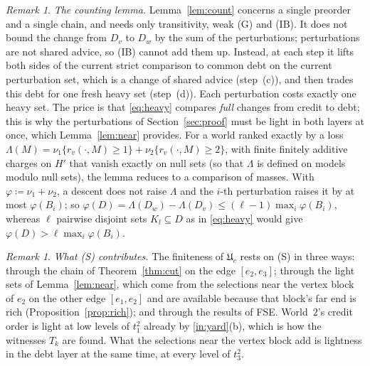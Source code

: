 \documentclass[11pt]{article}
\theoremstyle{definition}\newtheorem{definition}[theorem]{Definition}
\theoremstyle{remark}\newtheorem{remark}[theorem]{Remark}
\newcommand{\UU}{\mathfrak U}
\begin{document}
\begin{remark}\label{rem:count}
\emph{The counting lemma.} Lemma~\ref{lem:count} concerns a single preorder
and a single chain, and needs only transitivity, weak (G) and (IB). It does
not bound the change from $D_v$ to $D_w$ by the sum of the perturbations;
perturbations are not shared advice, so (IB) cannot add them up. Instead, at
each step it lifts both sides of the current strict comparison to common
debt on the current perturbation set, which is a change of shared advice
(step~(c)), and then trades this debt for one fresh heavy set (step~(d)).
Each perturbation costs exactly one heavy set. The price is that
\eqref{eq:heavy} compares \emph{full} changes from credit to debt; this is
why the perturbations of Section~\ref{sec:proof} must be light in both
layers at once, which Lemma~\ref{lem:near} provides. For a world ranked
exactly by a loss $\Lambda(M)=\nu_1\{r_v(\cdot,M)\ge1\}+
\nu_2\{r_v(\cdot,M)\ge2\}$, with finite finitely additive charges on $H'$
that vanish exactly on null sets (so that $\Lambda$ is defined on models
modulo null sets), the lemma reduces to a comparison of masses. With
$\varphi\coloneqq\nu_1+\nu_2$, a descent does not raise $\Lambda$ and the
$i$-th perturbation raises it by at most $\varphi(B_i)$; so
$\varphi(D)=\Lambda(D_w)-\Lambda(D_v)\le(\ell-1)\max_i\varphi(B_i)$, whereas
$\ell$ pairwise disjoint sets $K_l\subseteq D$ as in \eqref{eq:heavy} would
give $\varphi(D)>\ell\max_i\varphi(B_i)$.
\end{remark}

\begin{remark}\label{rem:S}
\emph{What (S) contributes.} The finiteness of $\UU_c$ rests on (S) in
three ways: through the chain of Theorem~\ref{thm:cut} on the edge
$[e_2,e_3]$; through the light sets of Lemma~\ref{lem:near}, which come from
the selections near the vertex block of $e_2$ on the other edge $[e_1,e_2]$
and are available because that block's far end is rich
(Proposition~\ref{prop:rich}); and through the results of FSE. World~$2$'s
credit order is light at low levels of $t^2_1$ already by \ref{in:yard}(b),
which is how the witnesses $T_k$ are found. What the selections near the
vertex block add is lightness in the debt layer at the same time, at every
level of $t^2_3$.
\end{remark}
\end{document}
